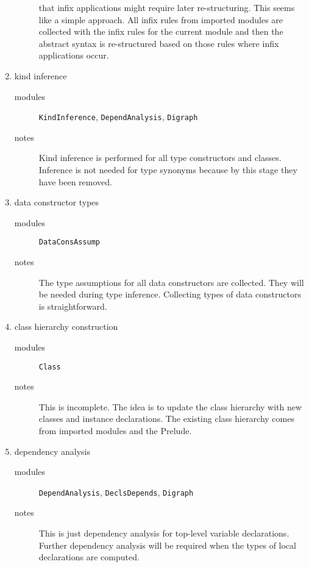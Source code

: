 \documentclass{article}
\begin{document}
\begin{enumerate}
\begin{description}
                that infix applications might require later re-structuring.
                This seems like a simple approach. All infix rules from
                imported modules are collected with the infix rules for the
                current module and then the abstract syntax is re-structured
                based on those rules where infix applications occur.
     \end{description}
\item kind inference 
     \begin{description}
     \item[modules] \texttt{KindInference}, \texttt{DependAnalysis}, \texttt{Digraph}
     \item[notes] Kind inference is performed for all type constructors and classes.
                  Inference is not needed for type synonyms because by this stage they
                  have been removed. 
     \end{description}
\item data constructor types 
     \begin{description}
     \item[modules] \texttt{DataConsAssump}
     \item[notes] The type assumptions for all data constructors are collected. They
                  will be needed during type inference. Collecting types
                  of data constructors is straightforward.
     \end{description}
\item class hierarchy construction 
     \begin{description}
     \item[modules] \texttt{Class}
     \item[notes] This is incomplete. The idea is to update the class hierarchy
                  with new classes and instance declarations. The existing class
                  hierarchy comes from imported modules and the Prelude.
     \end{description}
\item dependency analysis 
     \begin{description}
     \item[modules] \texttt{DependAnalysis}, \texttt{DeclsDepends}, \texttt{Digraph}
     \item[notes] This is just dependency analysis for top-level variable declarations.
                  Further dependency analysis will be required when the types of local
                  declarations are computed. 

\end{description}
\end{enumerate}
\end{document}
